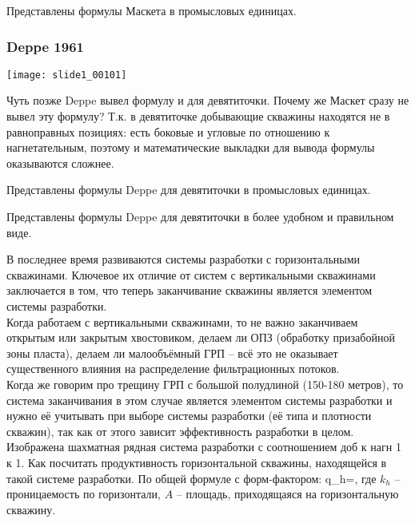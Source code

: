 \documentclass[main.tex]{subfiles}
\begin{document}

Представлены формулы Маскета в промысловых единицах.

\subsubsection{Deppe 1961}

\texttt{[image: slide1\_00101]}

Чуть позже Deppe вывел формулу и для девятиточки. Почему же Маскет сразу не вывел эту формулу? Т.к. в девятиточке добывающие скважины находятся не в равноправных позициях: есть боковые и угловые по отношению к нагнетательным, поэтому и математические выкладки для вывода формулы оказываются сложнее.


Представлены формулы Deppe для девятиточки в промысловых единицах.


Представлены формулы Deppe для девятиточки в более удобном и правильном виде.


В последнее время развиваются системы разработки с горизонтальными скважинами. Ключевое их отличие от систем с вертикальными скважинами заключается в том, что теперь заканчивание скважины является элементом системы разработки.\\

Когда работаем с вертикальными скважинами, то не важно заканчиваем открытым или закрытым хвостовиком, делаем ли ОПЗ (обработку призабойной зоны пласта), делаем ли малообъёмный ГРП -- всё это не оказывает существенного влияния на распределение фильтрационных потоков.\\

Когда же говорим про трещину ГРП с большой полудлиной (150-180 метров), то система заканчивания в этом случае является элементом системы разработки и нужно её учитывать при выборе системы разработки (её типа и плотности скважин), так как от этого зависит эффективность разработки в целом.\\

Изображена шахматная рядная система разработки с соотношением доб к нагн 1 к 1. Как посчитать продуктивность горизонтальной скважины, находящейся в такой системе разработки. По общей формуле с форм-фактором:
\beq
q_h=,
\eeq
где $k_h$ -- проницаемость по горизонтали, $A$ -- площадь, приходящаяся на горизонтальную скважину.\\
\end{document}
